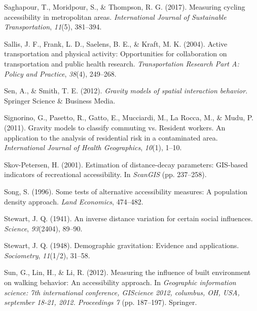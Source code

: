 \documentclass[
11pt, %
oneside, %
english, %
singlespacing, %
]{macthesis} %
\newlength{\cslhangindent}
\newenvironment{CSLReferences}[2] %
 {%
  \setlength{\parindent}{0pt}
  \ifodd #1 \everypar{\setlength{\hangindent}{\cslhangindent}}\ignorespaces\fi
  \ifnum #2 > 0
  \setlength{\parskip}{#2\baselineskip}
  \fi
 }%
 {}
\begin{document}
\begin{CSLReferences}{1}{0}
\leavevmode{}%
Saghapour, T., Moridpour, S., \& Thompson, R. G. (2017). Measuring cycling accessibility in metropolitan areas. \emph{International Journal of Sustainable Transportation}, \emph{11}(5), 381--394.

\leavevmode{}%
Sallis, J. F., Frank, L. D., Saelens, B. E., \& Kraft, M. K. (2004). Active transportation and physical activity: Opportunities for collaboration on transportation and public health research. \emph{Transportation Research Part A: Policy and Practice}, \emph{38}(4), 249--268.

\leavevmode{}%
Sen, A., \& Smith, T. E. (2012). \emph{Gravity models of spatial interaction behavior}. Springer Science \& Business Media.

\leavevmode{}%
Signorino, G., Pasetto, R., Gatto, E., Mucciardi, M., La Rocca, M., \& Mudu, P. (2011). Gravity models to classify commuting vs. Resident workers. An application to the analysis of residential risk in a contaminated area. \emph{International Journal of Health Geographics}, \emph{10}(1), 1--10.

\leavevmode{}%
Skov-Petersen, H. (2001). Estimation of distance-decay parameters: GIS-based indicators of recreational accessibility. In \emph{ScanGIS} (pp. 237--258).

\leavevmode{}%
Song, S. (1996). Some tests of alternative accessibility measures: A population density approach. \emph{Land Economics}, 474--482.

\leavevmode{}%
Stewart, J. Q. (1941). An inverse distance variation for certain social influences. \emph{Science}, \emph{93}(2404), 89--90.

\leavevmode{}%
Stewart, J. Q. (1948). Demographic gravitation: Evidence and applications. \emph{Sociometry}, \emph{11}(1/2), 31--58.

\leavevmode{}%
Sun, G., Lin, H., \& Li, R. (2012). Measuring the influence of built environment on walking behavior: An accessibility approach. In \emph{Geographic information science: 7th international conference, GIScience 2012, columbus, OH, USA, september 18-21, 2012. Proceedings 7} (pp. 187--197). Springer.


\end{CSLReferences}
\end{document}
